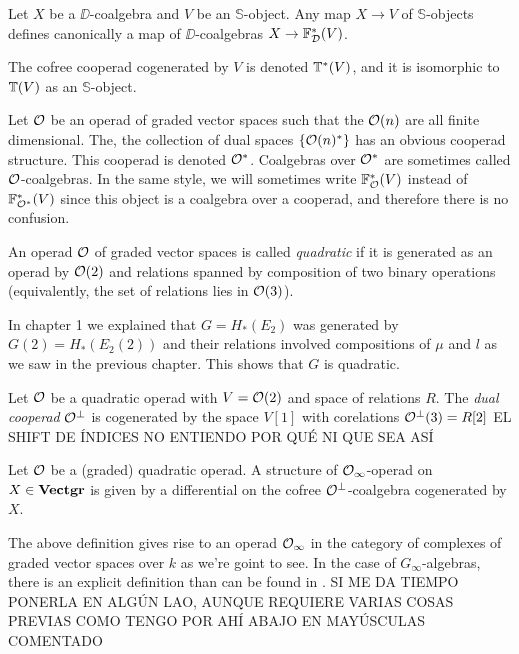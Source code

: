 \documentclass[TFM.tex]{subfiles}
\begin{document}
Let $X$ be a $\DD$-coalgebra and $V$ be an $\mathbb{S}$-object. Any map $X\to V$ of $\mathbb{S}$-objects defines canonically a map of $\DD$-coalgebras $X\to \mathbb{F}_{\mathcal{D}}^*(V)$.  

The cofree cooperad cogenerated by $V$ is denoted $\mathbb{T}^*(V)$, and it is isomorphic to $\mathbb{T}(V)$ as an $\mathbb{S}$-object. 

\begin{remark}
Let ${\mathcal O}$ be an operad of graded vector spaces such that the ${\mathcal O}(n)$ are all finite dimensional. The, the collection of dual spaces $\{{\mathcal O}(n)^*\}$ has an obvious cooperad structure. This cooperad is denoted ${\mathcal O}^*$. Coalgebras over ${\mathcal O}^*$ are sometimes called ${\mathcal O}$-coalgebras. In the same style, we will sometimes write $\mathbb{F}^*_{\mathcal O}(V)$ instead of $\mathbb{F}^*_{{\mathcal O}^*}(V)$ since this object is a coalgebra over a cooperad, and therefore there is no confusion.
\end{remark}

\begin{defi}
An operad ${\mathcal O}$ of graded vector spaces is called \emph{quadratic} if it is generated as an operad by ${\mathcal O}(2)$ and relations spanned by composition of two binary operations (equivalently, the set of relations lies in ${\mathcal O}(3)$). 
\end{defi}

In chapter 1 we explained that $G=H_*(E_2)$ was generated by $G(2)=H_*(E_2(2))$ and their relations involved compositions of $\mu$ and $l$ as we saw in the previous chapter. This shows that $G$ is quadratic. %

\begin{defi}
Let ${\mathcal O}$ be a quadratic operad with $V={\mathcal O}(2)$ and space of relations $R$. The \emph{dual cooperad} ${\mathcal O}^{\perp}$ is cogenerated by the space $V[1]$ with corelations ${\mathcal O}^\perp(3)=R[2]$ EL SHIFT DE ÍNDICES NO ENTIENDO POR QUÉ NI QUE SEA ASÍ
\end{defi}

\begin{defi}
Let ${\mathcal O}$ be a (graded) quadratic operad. A structure of ${\mathcal O}_\infty$-operad on $X\in\mathrm{\mathbf{Vectgr}}$ is given by a differential on the cofree ${\mathcal O}^\perp$-coalgebra cogenerated by $X$.
\end{defi}

The above definition gives rise to an operad ${\mathcal O}_\infty$ in the category of complexes of graded vector spaces over $k$ as we're goint to see. In the case of $G_\infty$-algebras, there is an explicit definition than can be found in \cite[Proposition 16]{Galvez}. SI ME DA TIEMPO PONERLA EN ALGÚN LAO, AUNQUE REQUIERE VARIAS COSAS PREVIAS COMO TENGO POR AHÍ ABAJO EN MAYÚSCULAS COMENTADO
\end{document}
